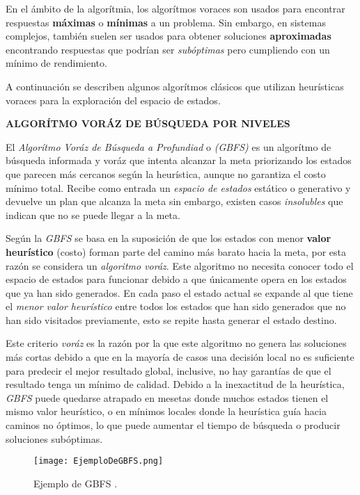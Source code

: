 En el ámbito de la algorítmia, los algorítmos voraces son usados para encontrar respuestas \textbf{máximas} o \textbf{mínimas} a un problema. Sin embargo, en sistemas complejos, también suelen ser usados para obtener soluciones \textbf{aproximadas} encontrando respuestas que podrían ser \textit{subóptimas} pero cumpliendo con un mínimo de rendimiento. 

A continuación se describen algunos algorítmos clásicos que utilizan heurísticas voraces para la exploración del espacio de estados.

\newpage

\textbf{ALGORÍTMO VORÁZ DE BÚSQUEDA POR NIVELES}

El \textit{Algorítmo Voráz de Búsqueda a Profundiad} o \textit{(GBFS)} es un algorítmo de búsqueda informada y voráz que intenta alcanzar la meta priorizando los estados que parecen más cercanos según la heurística, aunque no garantiza el costo mínimo total. Recibe como entrada un \textit{espacio de estados} estático o generativo y devuelve un plan que alcanza la meta sin embargo, existen casos \textit{insolubles} que indican que no se puede llegar a la meta.

Según \parencite{heusner2017understanding} la \textit{GBFS} se basa en la suposición de que los estados con menor \textbf{valor heurístico} (costo) forman parte del camino más barato hacia la meta, por esta razón se considera un \textit{algoritmo voráz}. Este algoritmo no necesita conocer todo el espacio de estados para funcionar debido a que únicamente opera en los estados que ya han sido generados. En cada paso el estado actual se expande al que tiene el \textit{menor valor heurístico} entre todos los estados que han sido generados que no han sido visitados previamente, esto se repite hasta generar el estado destino. 

Este criterio \textit{voráz} es la razón por la que este algoritmo no genera las soluciones más cortas debido a que en la mayoría de casos una decisión local no es suficiente para predecir el mejor resultado global, inclusive, no hay garantías de que el resultado tenga un mínimo de calidad. Debido a la inexactitud de la heurística, \textit{GBFS} puede quedarse atrapado en mesetas donde muchos estados tienen el mismo valor heurístico, o en mínimos locales donde la heurística guía hacia caminos no óptimos, lo que puede aumentar el tiempo de búsqueda o producir soluciones subóptimas.

\begin{figure}[h!]
    \centering
    \texttt{[image: EjemploDeGBFS.png]}
    \caption{Ejemplo de GBFS \parencite{heusner2017understanding}.}
    \label{fig:EjemploGBFS}
\end{figure}

